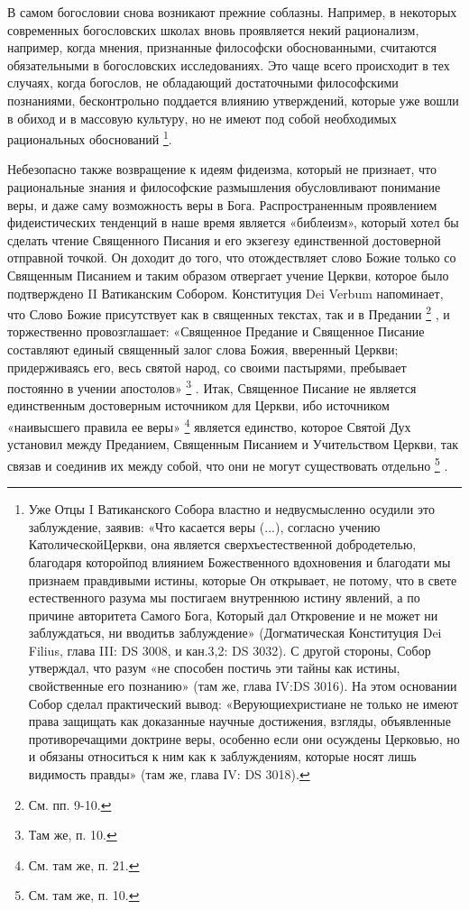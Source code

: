 \documentclass[a5paper,10pt]{article}
\begin{document}
В самом богословии снова возникают прежние соблазны. Например, в некоторых
современных богословских школах вновь проявляется некий рационализм, например,
когда мнения, признанные философски обоснованными, считаются обязательными в
богословских исследованиях. Это чаще всего происходит в тех случаях, когда
богослов, не обладающий достаточными философскими познаниями, бесконтрольно
поддается влиянию утверждений, которые уже вошли в обиход и в массовую
культуру, но не имеют под собой необходимых рациональных обоснований
\footnote{Уже Отцы I Ватиканского Собора властно и недвусмысленно осудили это
заблуждение, заявив: «Что касается веры (...), согласно учению
КатолическойЦеркви, она является сверхъестественной добродетелью, благодаря
которойпод влиянием Божественного вдохновения и благодати мы признаем
правдивыми истины, которые Он открывает, не потому, что в свете естественного
разума мы постигаем внутреннюю истину явлений, а по причине авторитета Самого
Бога, Который дал Откровение и не может ни заблуждаться, ни вводитьв
заблуждение» (Догматическая Конституция Dei Filius, глава III: DS 3008, и
кан.3,2: DS 3032). С другой стороны, Собор утверждал, что разум «не способен
постичь эти тайны как истины, свойственные его познанию» (там же, глава IV:DS
3016). На этом основании Собор сделал практический вывод: «Верующиехристиане не
только не имеют права защищать как доказанные научные достижения, взгляды,
объявленные противоречащими доктрине веры, особенно если они осуждены Церковью,
но и обязаны относиться к ним как к заблуждениям, которые носят лишь видимость
правды» (там же, глава IV: DS 3018).}.

Небезопасно также возвращение к идеям фидеизма, который не признает, что
рациональные знания и философские размышления обусловливают понимание веры, и
даже саму возможность веры в Бога. Распространенным проявлением фидеистических
тенденций в наше время является «библеизм», который хотел бы сделать чтение
Священного Писания и его экзегезу единственной достоверной отправной точкой. Он
доходит до того, что отождествляет слово Божие только со Священным Писанием и
таким образом отвергает учение Церкви, которое было подтверждено II Ватиканским
Собором. Конституция Dei Verbum напоминает, что Слово Божие присутствует как в
священных текстах, так и в Предании  \footnote{См. пп. 9-10.} , и торжественно
провозглашает: «Священное Предание и Священное Писание составляют единый
священный залог слова Божия, вверенный Церкви; придерживаясь его, весь святой
народ, со своими пастырями, пребывает постоянно в учении апостолов»
\footnote{Там же, п. 10.} . Итак, Священное Писание не является единственным
достоверным источником для Церкви, ибо источником «наивысшего правила ее веры»
\footnote{См. там же, п. 21.} является единство, которое Святой Дух установил
между Преданием, Священным Писанием и Учительством Церкви, так связав и
соединив их между собой, что они не могут существовать отдельно  \footnote{См.
там же, п. 10.} .
\end{document}
